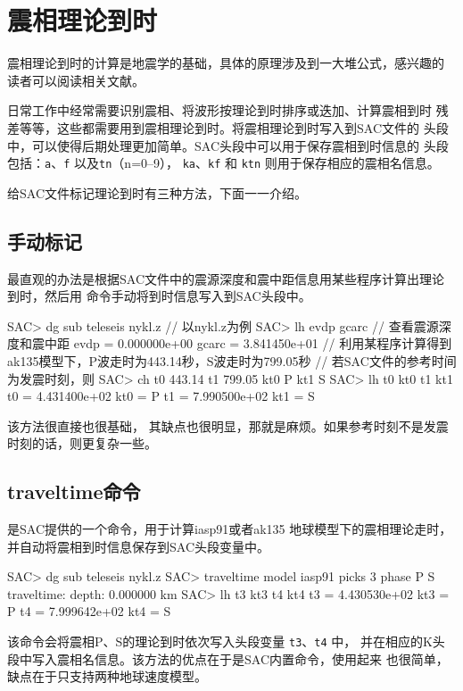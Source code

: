 \section{震相理论到时}
震相理论到时的计算是地震学的基础，具体的原理涉及到一大堆公式，感兴趣的
读者可以阅读相关文献。

日常工作中经常需要识别震相、将波形按理论到时排序或迭加、计算震相到时
残差等等，这些都需要用到震相理论到时。将震相理论到时写入到SAC文件的
头段中，可以使得后期处理更加简单。SAC头段中可以用于保存震相到时信息的
头段包括：\texttt{a}、\texttt{f} 以及\texttt{tn}（n=0--9），
\texttt{ka}、\texttt{kf} 和 \texttt{ktn} 则用于保存相应的震相名信息。

给SAC文件标记理论到时有三种方法，下面一一介绍。

\subsection{手动标记}
最直观的办法是根据SAC文件中的震源深度和震中距信息用某些程序计算出理论
到时，然后用  命令手动将到时信息写入到SAC头段中。
\begin{SACCode}
SAC> dg sub teleseis nykl.z     // 以nykl.z为例
SAC> lh evdp gcarc              // 查看震源深度和震中距
     evdp = 0.000000e+00
    gcarc = 3.841450e+01
// 利用某程序计算得到ak135模型下，P波走时为443.14秒，S波走时为799.05秒
// 若SAC文件的参考时间为发震时刻，则
SAC> ch t0 443.14 t1 799.05 kt0 P kt1 S
SAC> lh t0 kt0 t1 kt1
     t0 = 4.431400e+02
    kt0 = P
     t1 = 7.990500e+02
    kt1 = S
\end{SACCode}
该方法很直接也很基础， 其缺点也很明显，那就是麻烦。如果参考时刻不是发震
时刻的话，则更复杂一些。

\subsection{traveltime命令}
 是SAC提供的一个命令，用于计算iasp91或者ak135
地球模型下的震相理论走时，并自动将震相到时信息保存到SAC头段变量中。
\begin{SACCode}
SAC> dg sub teleseis nykl.z
SAC> traveltime model iasp91 picks 3 phase P S
traveltime: depth: 0.000000 km
SAC> lh t3 kt3 t4 kt4
         t3 = 4.430530e+02
        kt3 = P
         t4 = 7.999642e+02
        kt4 = S
\end{SACCode}
该命令会将震相P、S的理论到时依次写入头段变量 \texttt{t3}、\texttt{t4} 中，
并在相应的K头段中写入震相名信息。该方法的优点在于是SAC内置命令，使用起来
也很简单，缺点在于只支持两种地球速度模型。

